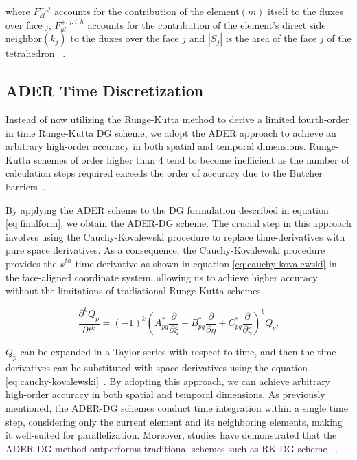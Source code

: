 where $F_{kl}^{-,j}$ accounts for the contribution of the element$\left(m\right)$ itself to the fluxes over face j, $F_{kl}^{+,j,i,h}$ accounts for the contribution
of the element's direct side neighbor$\left(k_j\right)$ to the fluxes over the face $j$ and $\left|S_j\right|$ is the area of the face $j$ of the tetrahedron ~\parencite{dumbser1}.

\subsection[ADER Time Discretization]{ADER Time Discretization}

Instead of now utilizing the Runge-Kutta method to derive a limited fourth-order in time Runge-Kutta \ac{DG} scheme, we adopt the 
\ac{ADER} approach to achieve an arbitrary high-order accuracy in both spatial and temporal dimensions. Runge-Kutta schemes of order
higher than 4 tend to become inefficient as the number of calculation steps required exceeds the order of accuracy due to the Butcher barriers~\parencite{butcher1987numerical}.

\par By applying the \ac{ADER} scheme to the \ac{DG} formulation described in equation \ref{eq:finalform}, we obtain the \ac{ADER}-\ac{DG} scheme.
The crucial step in this approach involves using the Cauchy-Kovalewski procedure to replace time-derivatives with pure space derivatives.
As a consequence, the Cauchy-Kovalewski procedure provides the $k^{th}$ time-derivative as shown in equation \ref{eq:cauchy-kovalewski} in the face-aligned coordinate system, allowing us to
achieve higher accuracy without the limitations of tradiational Runge-Kutta schemes

\begin{equation}
    \frac{\partial^k Q_p}{\partial t^k} = \left(-1\right)^k \left(A_{pq}^* \frac{\partial}{\partial \xi} + B_{pq}^* \frac{\partial}{\partial \eta} + C_{pq}^* \frac{\partial}{\partial \zeta}\right)^k Q_q .
    \label{eq:cauchy-kovalewski}
\end{equation}

$Q_p$ can be expanded in a Taylor series with respect to time, and then the time derivatives can be substituted with space derivatives
using the equation \ref{eq:cauchy-kovalewski}~\parencite[Sec. 3.2]{dumbser1}. By adopting this approach, we can achieve arbitrary high-order
accuracy in both spatial and temporal dimensions. As previously mentioned, the \ac{ADER}-\ac{DG} schemes conduct time integration
within a single time step, considering only the current element and its neighboring elements, making it well-suited for parallelization.
Moreover, studies have demonstrated that the \ac{ADER}-\ac{DG} method outperforms traditional schemes such as \ac{RK-DG} scheme ~\parencite{dumbser2005ader}.

